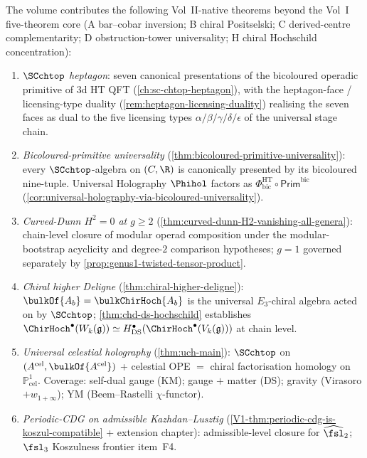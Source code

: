 \noindent
The volume contributes the following Vol~II-native theorems beyond
the Vol~I five-theorem core
\textup(A bar--cobar inversion; B chiral Positselski; C derived-centre
complementarity; D obstruction-tower universality; H chiral Hochschild
concentration\textup):
\begin{enumerate}
\item \emph{$\SCchtop$ heptagon}: seven canonical presentations of
the bicoloured operadic primitive of 3d HT QFT
\textup(\cref{ch:sc-chtop-heptagon}\textup), with the heptagon-face /
licensing-type duality
\textup(\cref{rem:heptagon-licensing-duality}\textup) realising the
seven faces as dual to the five licensing types $\alpha / \beta /
\gamma / \delta / \epsilon$ of the universal stage chain.
\item \emph{Bicoloured-primitive universality}
\textup(\cref{thm:bicoloured-primitive-universality}\textup): every
$\SCchtop$-algebra on $(C, \R)$ is canonically presented by its
bicoloured nine-tuple. Universal Holography
$\Phihol$ factors as
$\Phi^{\mathrm{HT}}_{\mathrm{bic}} \circ \mathsf{Prim}^{\mathrm{bic}}$
\textup(\cref{cor:universal-holography-via-bicoloured-universality}\textup).
\item \emph{Curved-Dunn $H^2 = 0$ at $g \ge 2$}
\textup(\cref{thm:curved-dunn-H2-vanishing-all-genera}\textup):
chain-level closure of modular operad composition under the
modular-bootstrap acyclicity and degree-$2$ comparison
hypotheses; $g = 1$ governed separately by
\cref{prop:genus1-twisted-tensor-product}.
\item \emph{Chiral higher Deligne}
\textup(\cref{thm:chiral-higher-deligne}\textup): $\bulkOf{A_b} =
\bulkChirHoch{A_b}$ is the universal $E_3$-chiral algebra acted on
by $\SCchtop$; \cref{thm:chd-ds-hochschild} establishes
$\ChirHoch^\bullet(W_k(\fg)) \simeq H^\bullet_{\mathrm{DS}}(
\ChirHoch^\bullet(V_k(\fg)))$ at chain level.
\item \emph{Universal celestial holography}
\textup(\cref{thm:uch-main}\textup): $\SCchtop$ on
$(A^{\mathrm{cel}}, \bulkOf{A^{\mathrm{cel}}})$ + celestial OPE $=$
chiral factorisation homology on $\mathbb{P}^1_{\mathrm{cel}}$.
Coverage: self-dual gauge \textup(KM\textup); gauge $+$ matter
\textup(DS\textup); gravity \textup(Virasoro $+ w_{1+\infty}$\textup);
YM \textup(Beem--Rastelli $\chi$-functor\textup).
\item \emph{Periodic-CDG on admissible Kazhdan--Lusztig}
\textup(\cref{V1-thm:periodic-cdg-is-koszul-compatible} +
extension chapter\textup): admissible-level closure for
$\widehat{\fsl}_2$; $\fsl_3$ Koszulness frontier item~F4.

\end{enumerate}

